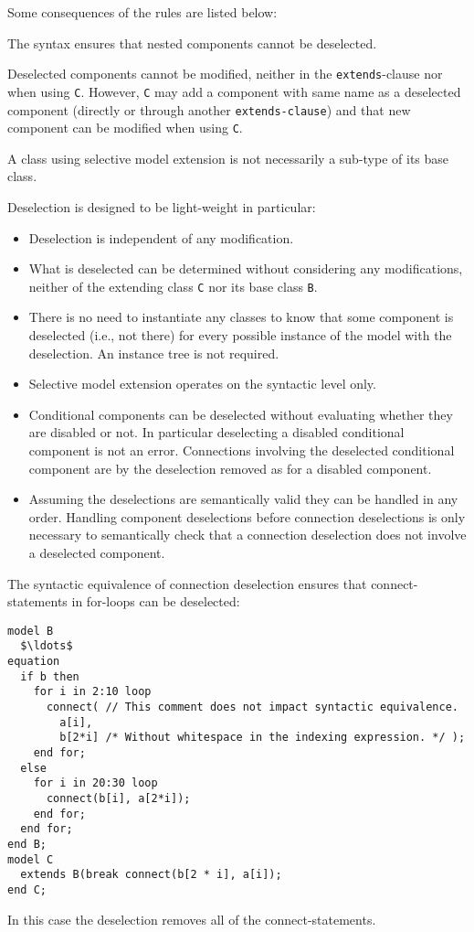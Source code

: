 \begin{nonnormative}
Some consequences of the rules are listed below:

The syntax ensures that nested components cannot be deselected.

Deselected components cannot be modified, neither in the \lstinline!extends!-clause nor when using \lstinline!C!.
However, \lstinline!C! may add a component with same name as a deselected component (directly or through another \lstinline!extends-clause!) and that new component can be modified when using \lstinline!C!.

A class using selective model extension is not necessarily a sub-type of its base class.

Deselection is designed to be light-weight in particular:
\begin{itemize}
\item Deselection is independent of any modification.
\item What is deselected can be determined without considering any modifications, neither of the extending class \lstinline!C! nor its base class \lstinline!B!.
\item There is no need to instantiate any classes to know that some component is deselected (i.e., not there) for every possible instance of the model with the deselection.
An instance tree is not required.
\item Selective model extension operates on the syntactic level only.
\item Conditional components can be deselected without evaluating whether they are disabled or not.
In particular deselecting a disabled conditional component is not an error.
Connections involving the deselected conditional component are by the deselection removed as for a disabled component.
\item Assuming the deselections are semantically valid they can be handled in any order.
Handling component deselections before connection deselections is only necessary to semantically check that a connection deselection does not involve a deselected component.
\end{itemize}

\begin{example}
The syntactic equivalence of connection deselection ensures that connect-statements in for-loops can be deselected:
\begin{lstlisting}[language=modelica]
model B
  $\ldots$
equation
  if b then
    for i in 2:10 loop
      connect( // This comment does not impact syntactic equivalence.
        a[i],
        b[2*i] /* Without whitespace in the indexing expression. */ );
    end for;
  else
    for i in 20:30 loop
      connect(b[i], a[2*i]);
    end for;
  end for;
end B;
model C
  extends B(break connect(b[2 * i], a[i]);
end C;
\end{lstlisting}
In this case the deselection removes all of the connect-statements.
\end{example}
\end{nonnormative}
